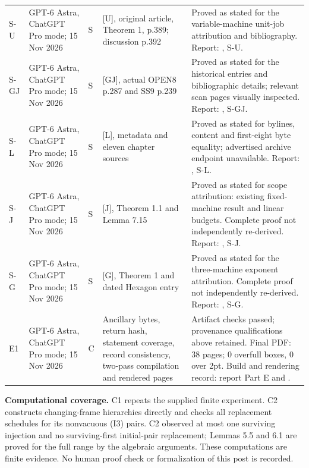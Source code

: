 \documentclass[11pt,a4paper]{article}
\theoremstyle{plain}
\theoremstyle{definition}
\begin{document}
{\begin{longtable}{@{}L{1.0cm}L{2.8cm}L{0.7cm}L{3.8cm}L{6.0cm}@{}}
S-U & GPT-6 Astra, ChatGPT Pro mode; 15 Nov 2026 & S & [U], original article, Theorem 1, p.389; discussion p.392 & Proved as stated for the variable-machine unit-job attribution and bibliography. Report: , S-U.\\[3pt]
S-GJ & GPT-6 Astra, ChatGPT Pro mode; 15 Nov 2026 & S & [GJ], actual OPEN8 p.287 and SS9 p.239 & Proved as stated for the historical entries and bibliographic details; relevant scan pages visually inspected. Report: , S-GJ.\\[3pt]
S-L & GPT-6 Astra, ChatGPT Pro mode; 15 Nov 2026 & S & [L], metadata and eleven chapter sources & Proved as stated for bylines, content and first-eight byte equality; advertised archive endpoint unavailable. Report: , S-L.\\[3pt]
S-J & GPT-6 Astra, ChatGPT Pro mode; 15 Nov 2026 & S & [J], Theorem 1.1 and Lemma 7.15 & Proved as stated for scope attribution: existing fixed-machine result and linear budgets. Complete proof not independently re-derived. Report: , S-J.\\[3pt]
S-G & GPT-6 Astra, ChatGPT Pro mode; 15 Nov 2026 & S & [G], Theorem 1 and dated Hexagon entry & Proved as stated for the three-machine exponent attribution. Complete proof not independently re-derived. Report: , S-G.\\[3pt]
E1 & GPT-6 Astra, ChatGPT Pro mode; 15 Nov 2026 & C & Ancillary bytes, return hash, statement coverage, record consistency, two-pass compilation and rendered pages & Artifact checks passed; provenance qualifications above retained. Final PDF: 38 pages; 0 overfull boxes, 0 over 2pt. Build and rendering record: report Part E and .\\
\end{longtable}}

\noindent\textbf{Computational coverage.} C1 repeats the supplied finite experiment. C2 constructs changing-frame hierarchies directly and checks all replacement schedules for its nonvacuous (I3) pairs. C2 observed at most one surviving injection and no surviving-first initial-pair replacement; Lemmas 5.5 and 6.1 are proved for the full range by the algebraic arguments. These computations are finite evidence. No human proof check or formalization of this post is recorded.
\end{document}
